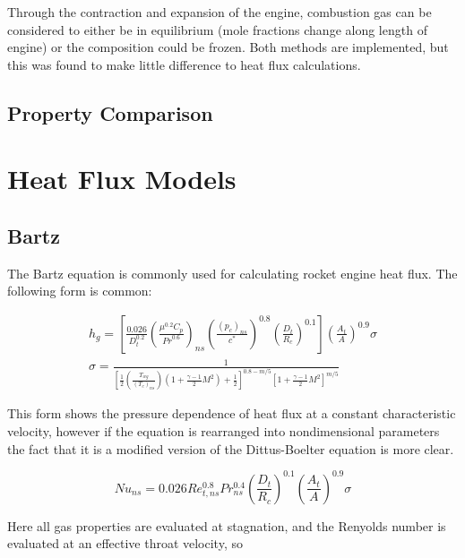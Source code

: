 \documentclass[11pt]{article}
\begin{document}
Through the contraction and expansion of the engine, combustion gas can be considered to either be in equilibrium (mole fractions change along length of engine) or the composition could be frozen. Both methods are implemented, but this was found to make little difference to heat flux calculations.


\subsection{Property Comparison}

\section{Heat Flux Models}

\subsection{Bartz}

The Bartz equation is commonly used for calculating rocket engine heat flux. The following form is common:

\begin{equation}
    \label{equation:bartz}
    \begin{split}
         h_g = \left[ \frac{0.026}{D_t^{0.2}} \left( \frac{\mu^{0.2} C_p}{{Pr}^{0.6}} \right)_{ns} \left( \frac{(p_c)_{ns}}{c^*} \right)^{0.8} \left( \frac{D_t}{R_c} \right)^{0.1} \right] \left( \frac{A_t}{A} \right)^{0.9} \sigma \\
         \sigma = \frac{1}{\left[ \frac{1}{2} \left( \frac{T_{wg}}{(T_c)_{ns}} \right) \left( 1 + \frac{\gamma - 1}{2} M^2 \right) + \frac{1}{2}\right]^{0.8-m/5} \left[ 1 + \frac{\gamma - 1}{2} M^2 \right]^{m/5}}
    \end{split}
\end{equation}

This form shows the pressure dependence of heat flux at a constant characteristic velocity, however if the equation is rearranged into nondimensional parameters the fact that it is a modified version of the Dittus-Boelter equation is more clear.

\begin{equation}
  Nu_{ns} = 0.026 Re_{t, ns}^{0.8} Pr_{ns}^{0.4} \left( \frac{D_t}{R_c} \right)^{0.1} \left( \frac{A_t}{A} \right)^{0.9} \sigma
\end{equation}

Here all gas properties are evaluated at stagnation, and the Renyolds number is evaluated at an effective throat velocity, so
\end{document}
